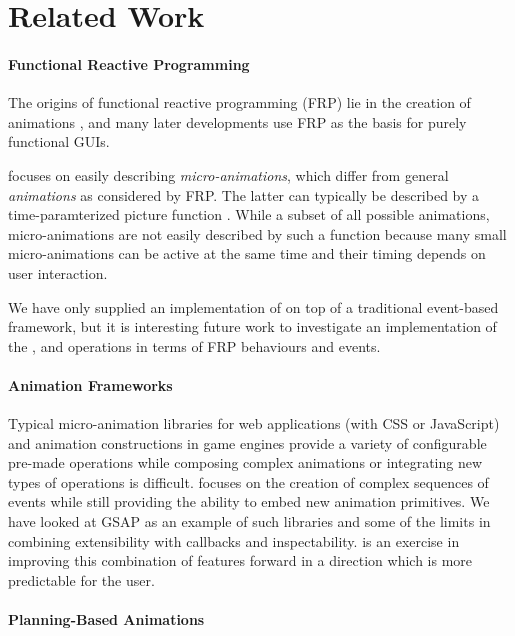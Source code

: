 \section{Related Work}
\label{sec:related}

\paragraph{Functional Reactive Programming}
The origins of functional reactive programming (FRP) lie in the creation of
animations \cite{DBLP:conf/icfp/ElliottH97}, and many later developments use
FRP as the basis for purely functional GUIs. 

\dsl{} focuses on easily describing \emph{micro-animations}, which differ from general
\emph{animations} as considered by FRP. The latter can typically be described
by a time-paramterized picture function . While a subset of
all possible animations, micro-animations are not easily described by such a
function because many small micro-animations can be active at the same time and
their timing depends on user interaction.

We have only supplied an implementation of \dsl{} on top of a traditional
event-based framework, but it is interesting future work to investigate an
implementation of the ,  and 
operations in terms of FRP behaviours and events.

\paragraph{Animation Frameworks}

Typical micro-animation libraries for web applications (with CSS or JavaScript)
and animation constructions in game engines provide a variety of configurable
pre-made operations while composing complex animations or integrating new types
of operations is difficult. \dsl{} focuses on the creation of complex sequences
of events while still providing the ability to embed new animation primitives.
We have looked at GSAP as an example of such libraries and some of the limits
in combining extensibility with callbacks and inspectability. \dsl{} is an
exercise in improving this combination of features forward in a direction which
is more predictable for the user.

\paragraph{Planning-Based Animations}

